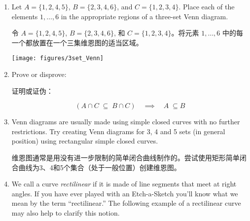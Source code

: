 \begin{enumerate}
    \item Let $A = \{1,2,4,5\}$, $B=\{2,3,4,6\}$, and $C=\{1,2,3,4\}$.  Place each of the elements $1, \ldots , 6$ in the appropriate regions of a three-set Venn diagram.
    
    令 $A = \{1,2,4,5\}$, $B=\{2,3,4,6\}$, 和 $C=\{1,2,3,4\}$。将元素 $1, \ldots , 6$ 中的每一个都放置在一个三集维恩图的适当区域。

    \centerline{\texttt{[image: figures/3set\_Venn]}}
    
    
    \item Prove or disprove:
    
    证明或证伪：
    
    \[ ( A \cap C \; \subseteq \; B \cap C ) \quad \implies \quad A \; \subseteq B \]
    
    
    \newpage
    
    \item  Venn diagrams are usually made using simple closed curves 
    with no further restrictions.
    Try creating Venn diagrams for 3, 4 and
    5 sets (in general position) using rectangular simple closed curves.
    
    维恩图通常是用没有进一步限制的简单闭合曲线制作的。尝试使用矩形简单闭合曲线为3、4和5个集合（处于一般位置）创建维恩图。
    
    \wbvfill
    
    \workbookpagebreak
    
    \item  We call a curve \emph{rectilinear} if it is made
    of line segments that meet at right angles.
    If you have ever
    played with an Etch-a-Sketch you'll know what we mean by the term 
    ``rectilinear.''  The following example of a rectilinear curve may
    also help to clarify this notion.
    

\end{enumerate}
